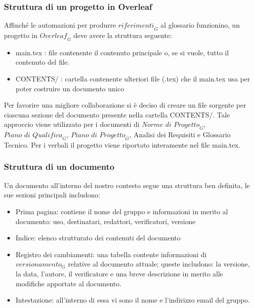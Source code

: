\subsubsection{Struttura di un progetto in Overleaf}
Affinché le automazioni per produrre $\textit{riferimenti}_G$ al glossario funzionino, un progetto in $\textit{Overleaf}_G$ deve avere la struttura seguente:

\begin{itemize}
    \item main.tex : file contenente il contenuto principale o, se si vuole, tutto il contenuto del file.
    \item CONTENTS/ : cartella contenente ulteriori file (.tex) che il main.tex usa per poter costruire un documento unico
\end{itemize}
Per favorire una migliore collaborazione si è deciso di creare un file sorgente per ciascuna sezione del documento presente nella cartella CONTENTS/. Tale approccio viene utilizzato per i documenti di $\textit{Norme di Progetto}_G$, $\textit{Piano di Qualifica}_G$, $\textit{Piano di Progetto}_G$, Analisi dei Requisiti e Glossario Tecnico.
Per i verbali il progetto viene riportato interamente nel file main.tex.

\subsubsection{Struttura di un documento}
Un documento all'interno del nostro contesto segue una struttura ben definita, le sue sezioni principali includono:
\begin{itemize}
    \item Prima pagina: contiene il nome del gruppo e informazioni in merito al documento: uso, destinatari, redattori, verificatori, versione
    \item Indice: elenco strutturato dei contenuti del documento
    \item Registro dei cambiamenti: una tabella contente informazioni di $\textit{versionamento}_G$ relative al documento attuale; queste includono: la versione, la data, l'autore, il verificatore e una breve descrizione in merito alle modifiche apportate al documento.
    \item Intestazione: all'interno di essa vi sono il nome e l'indirizzo email del gruppo.
\end{itemize}

